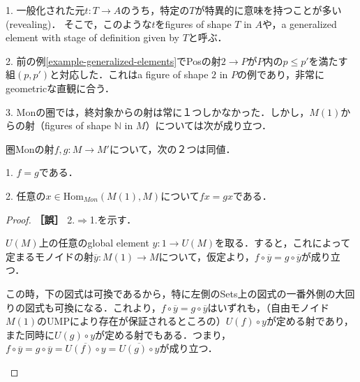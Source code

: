 \documentclass[uplatex, 12pt, dvipdfmx]{jsarticle}
\begin{document}
\begin{example}
    1. 一般化された元$t:T\to A$のうち，特定の$T$が特異的に意味を持つことが多い(revealing)．
    そこで，このような$t$をfigures of shape $T$ in $A$や，a generalized element with stage of definition given by $T$と呼ぶ．
    
    2. 前の例\ref{example-generalized-elements}でPosの射$2\to P$が$P$内の$p\le p'$を満たす組$(p,p')$と対応した．これはa figure of shape $2$ in $P$の例であり，非常にgeometricな直観に合う．

    3. Monの圏では，終対象からの射は常に１つしかなかった．しかし，$M(1)$からの射（figures of shape $\mathbb{N}$ in $M$）については次が成り立つ．
    \begin{proposition*}[$M(1)$-値点がモノイドの射を決定する]
        圏Monの射$f,g:M\to M'$について，次の２つは同値．

        1. $f=g$である．

        2. 任意の$x\in \mathrm{Hom}_{Mon}(M(1),M)$について$fx=gx$である．
    \end{proposition*}
    \begin{proof}\textbf{［誤］}
        2.$\Rightarrow$1.を示す．
        
        $U(M)$上の任意のglobal element $y:1\to U(M)$を取る．すると，これによって定まるモノイドの射$\overline{y}:M(1)\to M$について，仮定より，$f\circ \overline{y}=g\circ\overline{y}$が成り立つ．
        
        この時，下の図式は可換であるから，特に左側のSets上の図式の一番外側の大回りの図式も可換になる．これより，$f\circ \overline{y}=g\circ\overline{y}$はいずれも，（自由モノイド$M(1)$のUMPにより存在が保証されるところの）$U(f)\circ y$が定める射であり，また同時に$U(g)\circ y$が定める射でもある．つまり，$f\circ \overline{y}=g\circ\overline{y}=\overline{U(f)\circ y}=\overline{U(g)\circ y}$が成り立つ．
        \begin{center}
        \end{center}


\end{proof}
\end{example}
\end{document}

